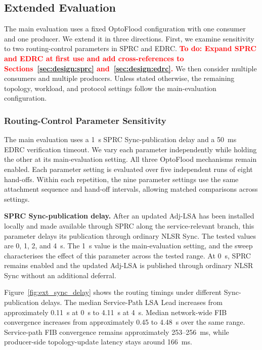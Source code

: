 \documentclass[10pt,conference]{IEEEtran}
\newcommand{\todo}[1]{\textbf{\textcolor{red}{To do: #1}}}
\begin{document}
\subsection{Extended Evaluation}
\label{sec:evaluation:extended}

The main evaluation uses a fixed OptoFlood configuration with one consumer and one producer. We extend it in three directions. First, we examine sensitivity to two routing-control parameters in SPRC and EDRC. \todo{Expand SPRC and EDRC at first use and add cross-references to Sections~\ref{sec:design:sprc} and~\ref{sec:design:edrc}.} We then consider multiple consumers and multiple producers. Unless stated otherwise, the remaining topology, workload, and protocol settings follow the main-evaluation configuration.

\subsubsection{Routing-Control Parameter Sensitivity}
\label{sec:evaluation:extended:sensitivity}

The main evaluation uses a 1~s SPRC Sync-publication delay and a 50~ms EDRC verification timeout. We vary each parameter independently while holding the other at its main-evaluation setting. All three OptoFlood mechanisms remain enabled. Each parameter setting is evaluated over five independent runs of eight hand-offs. Within each repetition, the nine parameter settings use the same attachment sequence and hand-off intervals, allowing matched comparisons across settings.

\textbf{SPRC Sync-publication delay.}
After an updated Adj-LSA has been installed locally and made available through SPRC along the service-relevant branch, this parameter delays its publication through ordinary NLSR Sync. The tested values are 0, 1, 2, and 4~s. The 1~s value is the main-evaluation setting, and the sweep characterises the effect of this parameter across the tested range. At 0~s, SPRC remains enabled and the updated Adj-LSA is published through ordinary NLSR Sync without an additional deferral.

Figure~\ref{fig:ext_sync_delay} shows the routing timings under different Sync-publication delays. The median Service-Path LSA Lead increases from approximately 0.11~s at 0~s to 4.11~s at 4~s. Median network-wide FIB convergence increases from approximately 0.45 to 4.48~s over the same range. Service-path FIB convergence remains approximately 253--256~ms, while producer-side topology-update latency stays around 166~ms.
\end{document}

